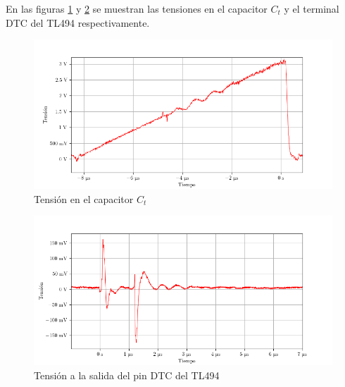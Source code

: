 En las figuras \ref{fig:ct_v} y \ref{fig:dtc_v} se muestran las tensiones en el capacitor $C_t$ y el terminal DTC del TL494 respectivamente.

\begin{figure}[H]
    \centering
    \includegraphics[width=\textwidth]{images/capturas-osciloscopio/17-11-2022/5.png}
    \caption{Tensión en el capacitor $C_t$} %
    \label{fig:ct_v}
\end{figure}


\begin{figure}[H]
    \centering
    \includegraphics[width=\textwidth]{images/capturas-osciloscopio/TL494/DTC_v.png}
    \caption{Tensión a la salida del pin DTC del TL494} %
    \label{fig:dtc_v}
\end{figure}



